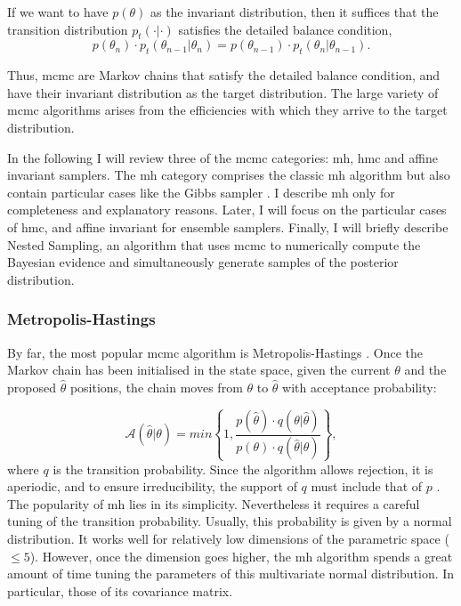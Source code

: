If we want to have $p(\theta)$ as the invariant distribution, then it suffices that the transition distribution $p_t(\cdot | \cdot)$ satisfies the detailed balance condition,
\begin{equation}
\label{eq:detailedbalance}
p(\theta_{n})\cdot p_t(\theta_{n-1}|\theta_n)=p(\theta_{n-1})\cdot p_t(\theta_n | \theta_{n-1}).
\end{equation}

Thus, \gls{mcmc} are Markov chains that satisfy the detailed balance condition, and have their invariant distribution as the target distribution. 
The large variety of \gls{mcmc} algorithms arises from the efficiencies with which they arrive to the target distribution.

In the following I will review three of the \gls{mcmc} categories: \gls{mh}, \gls{hmc} and affine invariant samplers. The \gls{mh} category comprises the classic \gls{mh} algorithm but also contain particular cases like the Gibbs sampler \citep{Geman1984}. I describe \gls{mh} only for completeness and explanatory reasons. Later, I will focus on the particular cases of \gls{hmc}, and affine invariant for ensemble samplers. Finally, I will briefly describe Nested Sampling, an algorithm that uses \gls{mcmc} to numerically compute the Bayesian evidence and simultaneously generate samples of the posterior distribution. 
\subsubsection{Metropolis-Hastings}
By far, the most popular \gls{mcmc} algorithm is Metropolis-Hastings \citep{Metropolis1953,Hastings1970}. Once the Markov chain has been initialised in the state space, given the current $\theta$ and the proposed $\hat{\theta}$ positions, the chain moves from $\theta$ to $\hat{\theta}$ with acceptance probability:

\begin{equation}
\mathcal{A}(\hat{\theta}|\theta)=min\left\{1,\frac{p(\hat{\theta})\cdot q(\theta|\hat{\theta})}{p(\theta)\cdot q(\hat{\theta}|\theta)}\right\},
\end{equation}
where $q$ is the transition probability. Since the algorithm allows rejection, it is aperiodic, and to ensure irreducibility, the support of $q$ must include that of $p$ \citep{Andrieu2003}. The popularity of \gls{mh} lies in its simplicity. Nevertheless it requires a careful tuning of the transition probability. Usually, this probability is given by a normal distribution. It works well for relatively low dimensions of the parametric space ($\leq 5$). However, once the dimension goes higher, the \gls{mh} algorithm spends a great amount of time tuning the parameters of this multivariate normal distribution. In particular, those of its covariance matrix.

